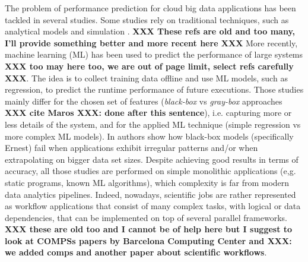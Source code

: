 \documentclass[a4paper, 10pt, conference]{ieeeconf}      %
\begin{document}
The problem of performance prediction for cloud big data applications has been tackled in several studies. Some  studies rely on traditional techniques, such as analytical models \cite{nelson1988approximate, mak, ardagna1, liang2000performance} and simulation \cite{bertoli2009jmt}.  \textbf{XXX These refs are old and too many, I'll provide something better and more recent here  XXX} More recently, machine learning (ML) has been used to predict the performance of large systems \cite{ernest, MUSTAFA20183767, pan2017hemingway, alipourfard2017cherrypick, ARDAGNA2019, lattuada2019gray} \textbf{XXX too may here too, we are out of page limit, select refs carefully XXX}.
The idea is to collect training data offline and use ML models, such as regression, to predict the runtime performance of future executions.
Those studies mainly differ for the chosen set of features (\textit{black-box} vs \textit{gray-box} approaches \textbf{XXX cite Maros XXX: done after this sentence}), i.e. capturing more or less details of the system,  and for the applied ML technique (simple regression vs more complex ML models). In \cite{maros2019machine} authors show how black-box models (specifically Ernest) fail when applications exhibit irregular patterns and/or when extrapolating on bigger data set sizes.
Despite achieving good results in terms of accuracy, all those studies are performed on simple monolithic applications (e,g. static programs, known ML algorithms), which complexity is far from modern data analytics pipelines.
Indeed, nowadays, scientific jobs are rather represented as workflow applications that consist of many complex tasks, with logical or data dependencies, that can be implemented on top of several parallel frameworks. \cite{atkinson2017scientific, warr2012scientific, lordan2014servicess} \textbf{XXX these are old too and I cannot be of help here but I suggest to look at COMPSs papers by Barcelona Computing Center and XXX: we added comps and another paper about scientific workflows}.
\color{violet}

\end{document}
